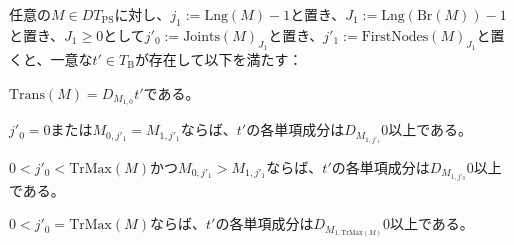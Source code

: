 \documentclass[dvipdfmx,uplatex]{jsarticle}
\theoremstyle{customnonumberbreakfortheorem}
\theoremstyle{customnonumberbreakforproof}
\begin{document}
\begin{lemma}[強単項性の下での部分表現の単項成分の基本性質]\label{強単項性の下での部分表現の単項成分の基本性質}
	任意の\(M \in DT_{\textrm{PS}}\)に対し、\(j_1 := \textrm{Lng}(M)-1\)と置き、\(J_1 := \textrm{Lng}(\textrm{Br}(M))-1\)と置き、\(J_1 \geq 0\)として\(j'_0 := \textrm{Joints}(M)_{J_1}\)と置き、\(j'_1 := \textrm{FirstNodes}(M)_{J_1}\)と置くと、一意な\(t' \in T_{\textrm{B}}\)が存在して以下を満たす：
	\begin{penumerate}
		\item \(\textrm{Trans}(M) = D_{M_{1,0}} t'\)である。
		\item \(j'_0 = 0\)または\(M_{0,j'_1} = M_{1,j'_1}\)ならば、\(t'\)の各単項成分は\(D_{M_{1,j'_1}} 0\)以上である。
		\item \(0 < j'_0 < \textrm{TrMax}(M)\)かつ\(M_{0,j'_1} > M_{1,j'_1}\)ならば、\(t'\)の各単項成分は\(D_{M_{1,j'_0}} 0\)以上である。
		\item \(0 < j'_0 = \textrm{TrMax}(M)\)ならば、\(t'\)の各単項成分は\(D_{M_{1,\textrm{TrMax}(M)}} 0\)以上である。
	\end{penumerate}
\end{lemma}
\end{document}
